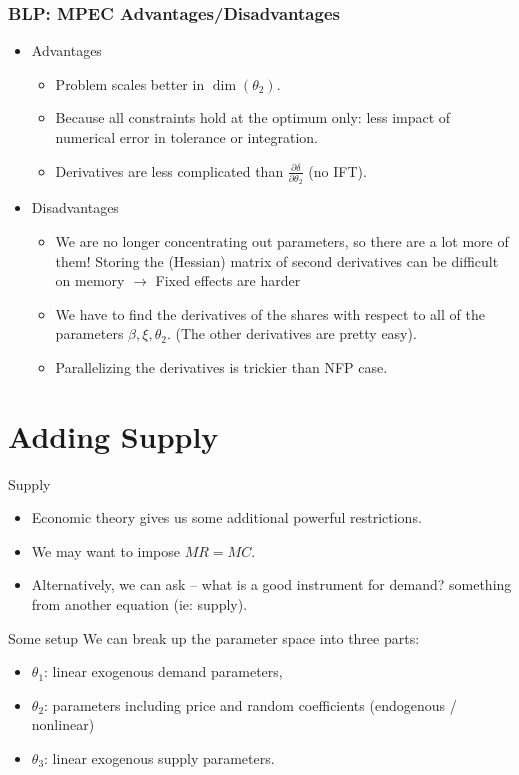 \begin{frame}
\frametitle{BLP: MPEC Advantages/Disadvantages}
\begin{itemize}
\item Advantages
\begin{itemize}
\item Problem scales better in $\dim(\theta_2)$.
\item Because all constraints hold at the optimum only: less impact of numerical error in tolerance or integration.
\item Derivatives are less complicated than $\frac{\partial \delta}{\partial \theta_2}$ (no IFT).
\end{itemize}
\item Disadvantages
\begin{itemize}
\item We are no longer concentrating out parameters, so there are a lot more of them! Storing the (Hessian) matrix of second derivatives can be difficult on memory $\rightarrow$ Fixed effects are harder
\item We have to find the derivatives of the shares with respect to all of the parameters $\beta,\xi,\theta_2$. (The other derivatives are pretty easy).
\item Parallelizing the derivatives is trickier than NFP case.
\end{itemize}
\end{itemize}
\end{frame}



\section{Adding Supply}
\begin{frame}{Supply}
\begin{itemize}
\item Economic theory gives us some additional powerful restrictions.
\item We may want to impose $MR = MC$.
\item Alternatively, we can ask -- what is a good instrument for demand? \alert{something from another equation} (ie: supply).
\end{itemize}
\end{frame}

\begin{frame}{Some setup}
We can break up the parameter space into three parts:
\begin{itemize}
\item $\theta_1$: linear exogenous demand parameters, 
 \item $\theta_2$: parameters including price and random coefficients (endogenous / nonlinear)
 \item $\theta_3$: linear exogenous supply parameters.
\end{itemize}
\end{frame}



